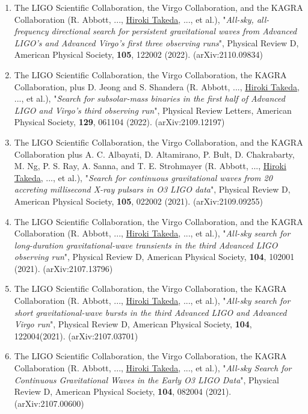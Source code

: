 \documentclass[uplatex, 11pt]{jsarticle}
\begin{document}
\begin{enumerate}
\item The LIGO Scientific Collaboration, the Virgo Collaboration, and the KAGRA Collaboration (R. Abbott, ..., \uline{Hiroki Takeda}, ..., et al.), "\emph{All-sky, all-frequency directional search for persistent gravitational waves from Advanced LIGO's and Advanced Virgo's first three observing runs}", Physical Review D, American Physical Society, {\bf 105}, 122002 (2022). (arXiv:2110.09834)\\

\item The LIGO Scientific Collaboration, the Virgo Collaboration, the KAGRA Collaboration, plus D. Jeong and S. Shandera (R. Abbott, ..., \uline{Hiroki Takeda}, ..., et al.), "\emph{Search for subsolar-mass binaries in the first half of Advanced LIGO and Virgo's third observing run}", Physical Review Letters, American Physical Society, {\bf 129}, 061104 (2022). (arXiv:2109.12197)\\

\item The LIGO Scientific Collaboration, the Virgo Collaboration, and the KAGRA Collaboration plus A. C. Albayati, D. Altamirano, P. Bult, D. Chakrabarty, M. Ng, P. S. Ray, A. Sanna, and T. E. Strohmayer (R. Abbott, ..., \uline{Hiroki Takeda}, ..., et al.), "\emph{Search for continuous gravitational waves from 20 accreting millisecond X-ray pulsars in O3 LIGO data}", Physical Review D, American Physical Society, {\bf 105}, 022002 (2021). (arXiv:2109.09255)\\

\item The LIGO Scientific Collaboration, the Virgo Collaboration, and the KAGRA Collaboration (R. Abbott, ..., \uline{Hiroki Takeda}, ..., et al.), "\emph{All-sky search for long-duration gravitational-wave transients in the third Advanced LIGO observing run}", Physical Review D, American Physical Society, {\bf 104}, 102001 (2021). (arXiv:2107.13796)\\

\item The LIGO Scientific Collaboration, the Virgo Collaboration, the KAGRA Collaboration (R. Abbott, ..., \uline{Hiroki Takeda}, ..., et al.), "\emph{All-sky search for short gravitational-wave bursts in the third Advanced LIGO and Advanced Virgo run}", Physical Review D, American Physical Society, {\bf 104}, 122004(2021). (arXiv:2107.03701)\\

\item The LIGO Scientific Collaboration, the Virgo Collaboration, the KAGRA Collaboration (R. Abbott, ..., \uline{Hiroki Takeda}, ..., et al.), "\emph{All-sky Search for Continuous Gravitational Waves in the Early O3 LIGO Data}", Physical Review D, American Physical Society, {\bf 104}, 082004 (2021). (arXiv:2107.00600)\\


\end{enumerate}
\end{document}
